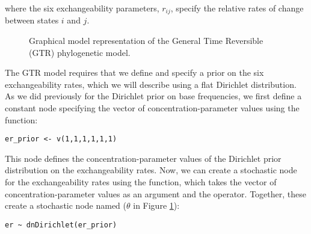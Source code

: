 where the six exchangeability parameters, $r_{ij}$, specify the relative rates of change between states $i$ and $j$.  


\begin{figure}[h!]
\centering
{}
\caption{\small Graphical model representation of the General Time Reversible (GTR) phylogenetic model.}
\label{fig:gtr}
\end{figure}

The GTR model requires that we define and specify a prior on the six exchangeability rates, which we will describe using a flat Dirichlet distribution.
As we did previously for the Dirichlet prior on base frequencies, we first define a constant node specifying the vector of concentration-parameter values using the  function:
{\tt \begin{snugshade*}
\begin{lstlisting}
er_prior <- v(1,1,1,1,1,1) 
\end{lstlisting}
\end{snugshade*}}
This node defines the concentration-parameter values of the Dirichlet prior distribution on the exchangeability rates. 
Now, we can create a stochastic node for the exchangeability rates using the  function, which takes the vector of concentration-parameter values as an argument and the \cl{\rbdn} operator. 
Together, these create a stochastic node named  ($\theta$ in Figure \ref{fig:gtr}): 
{\tt \begin{snugshade*}
\begin{lstlisting}
er ~ dnDirichlet(er_prior)
\end{lstlisting}
\end{snugshade*}}


